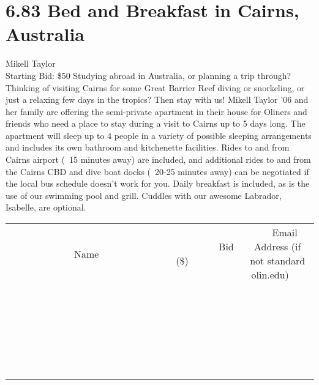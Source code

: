 \documentclass[11pt]{article}
\begin{document}
\section*{6.83 Bed and Breakfast in Cairns, Australia}
Mikell Taylor
\\
Starting Bid: \$50
\newline
Studying abroad in Australia, or planning a trip through? Thinking of visiting Cairns for some Great Barrier Reef diving or snorkeling, or just a relaxing few days in the tropics? Then stay with us! Mikell Taylor '06 and her family are offering the semi-private apartment in their house for Oliners and friends who need a place to stay during a visit to Cairns up to 5 days long. The apartment will sleep up to 4 people in a variety of possible sleeping arrangements and includes its own bathroom and kitchenette facilities. Rides to and from Cairns airport (~15 minutes away) are included, and additional rides to and from the Cairns CBD and dive boat docks (~20-25 minutes away) can be negotiated if the local bus schedule doesn't work for you. Daily breakfast is included, as is the use of our swimming pool and grill. Cuddles with our awesome Labrador, Isabelle, are optional.
\\[6ex]
\begin{tabular}{c c c}
~~~~~~~~~~~~~Name~~~~~~~~~~~~~ & ~~~~~~~~~Bid (\$)~~~~~~~~~  & ~~~Email Address (if not standard olin.edu)~~~\\
 & & \\
\hline
 & & \\
\hline
 & & \\
\hline
 & & \\
\hline
 & & \\
\hline
 & & \\
\hline
 & & \\
\hline
 & & \\
\hline
 & & \\
\hline
 & & \\
\hline
 & & \\
\hline
 & & \\
\hline
 & & \\
\hline
 & & \\
\hline
 & & \\
\hline
 & & \\
\hline
 & & \\
\hline
 & & \\
\hline
 & & \\
\hline
 & & \\
\hline
 & & \\
\hline
 & & \\
\hline
 & & \\
\hline
 & & \\
\hline
 & & \\
\hline
 & & \\
\hline
\end{tabular}
\newpage
\end{document}
